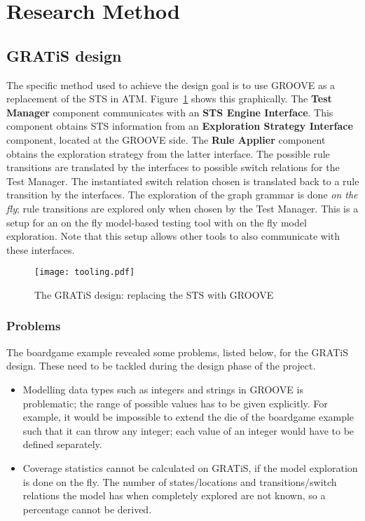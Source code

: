 \section{Research Method}\label{sec:research_methods}

\subsection{GRATiS design}
The specific method used to achieve the design goal is to use GROOVE as a replacement of the STS in ATM. Figure~\ref{fig:tooling} shows this graphically. The \textbf{Test Manager} component communicates with an \textbf{STS Engine Interface}. This component obtains STS information from an \textbf{Exploration Strategy Interface} component, located at the GROOVE side. The \textbf{Rule Applier} component obtains the exploration strategy from the latter interface. The possible rule transitions are translated by the interfaces to possible switch relations for the Test Manager. The instantiated switch relation chosen is translated back to a rule transition by the interfaces. The exploration of the graph grammar is done \textit{on the fly}; rule transitions are explored only when chosen by the Test Manager. This is a setup for an on the fly model-based testing tool with on the fly model exploration. Note that this setup allows other tools to also communicate with these interfaces.

\begin{figure}[ht]
  \begin{center}
    \texttt{[image: tooling.pdf]}
  \end{center}
  \caption{The GRATiS design: replacing the STS with GROOVE}
  \label{fig:tooling}
\end{figure}

\subsubsection{Problems}\label{sec:problems}
The boardgame example revealed some problems, listed below, for the GRATiS design. These need to be tackled during the design phase of the project. 
\begin{itemize}
  \item Modelling data types such as integers and strings in GROOVE is problematic; the range of possible values has to be given explicitly. For example, it would be impossible to extend the die of the boardgame example such that it can throw any integer; each value of an integer would have to be defined separately.
  \item Coverage statistics cannot be calculated on GRATiS, if the model exploration is done on the fly. The number of states/locations and transitions/switch relations the model has when completely explored are not known, so a percentage cannot be derived.
\end{itemize}

